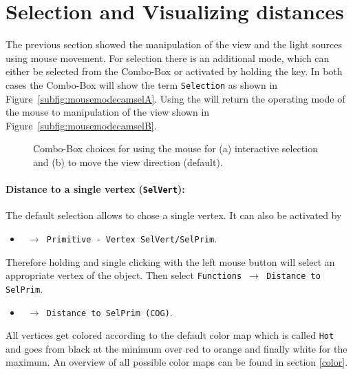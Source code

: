 \newpage
\section{Selection and Visualizing distances}
\label{distances}

The previous section showed the manipulation of the view and the light sources using mouse movement.
For selection there is an additional mode, 
which can either be selected from the Combo-Box or activated by holding the \!\Ctrl key.
In both cases the Combo-Box will show the term {\tt Selection} as shown in Figure~\ref{subfig:mousemodecamselA}.
Using the \!\Spacebar will return the operating mode of the mouse to manipulation of the view shown in Figure~\ref{subfig:mousemodecamselB}.
\begin{figure}[!hbt]
	\centering
	 \quad
	\caption{ Combo-Box choices for using the mouse for
	          (a) interactive selection and
	          (b) to move the view direction (default).
	}
	\label{fig:mousemodecamsel}
\end{figure}

\vspace{-5mm}
\paragraph{Distance to a single vertex ({\tt SelVert}):}
The default selection allows to chose a single vertex. 
It can also be activated by
\begin{itemize}
	\item[] \texttt{ $\rightarrow$ Primitive - Vertex SelVert/SelPrim}.
\end{itemize}
Therefore holding \!\Ctrl and single clicking with the left mouse button will select an appropriate vertex of the object. 
Then select {\tt Functions $\rightarrow$ Distance to SelPrim}. 
\begin{itemize}
	\item[] \texttt{ $\rightarrow$ Distance to SelPrim (COG)}.
\end{itemize}
All vertices get colored according to the default color map which is called {\tt Hot} and goes from black at the minimum over red to orange and finally white for the maximum. 
An overview of all possible color maps can be found in section \ref{color}.

